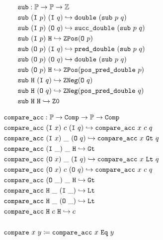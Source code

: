 \begin{align*}
&\texttt{sub} : \mathbb{P} \rightarrow \mathbb{P} \rightarrow \mathbb{Z} \\
& \texttt{sub}~(\texttt{I}~p)~(\texttt{I}~q) \hookrightarrow \texttt{double}~(\texttt{sub}~p~q) \\
& \texttt{sub}~(\texttt{I}~p)~(\texttt{O}~q) \hookrightarrow \texttt{succ\_double}~(\texttt{sub}~p~q) \\
& \texttt{sub}~(\texttt{I}~p)~\texttt{H} \hookrightarrow \mathop{\texttt{ZPos}} (\texttt{O}~p) \\
& \texttt{sub}~(\texttt{O}~p)~(\texttt{I}~q) \hookrightarrow \texttt{pred\_double}~(\texttt{sub}~p~q) \\
& \texttt{sub}~(\texttt{O}~p)~(\texttt{O}~q) \hookrightarrow \texttt{double}~(\texttt{sub}~p~q) \\
& \texttt{sub}~(\texttt{O}~p)~\texttt{H} \hookrightarrow \mathop{\texttt{ZPos}} (\texttt{pos\_pred\_double}~p) \\
& \texttt{sub}~\texttt{H}~(\texttt{I}~q) \hookrightarrow \mathop{\texttt{ZNeg}}    (\texttt{O}~q) \\
& \texttt{sub}~\texttt{H}~(\texttt{O}~q) \hookrightarrow \mathop{\texttt{ZNeg}}    (\texttt{pos\_pred\_double}~q) \\
& \texttt{sub}~\texttt{H}~\texttt{H} \hookrightarrow \texttt{Z0} \\
\end{align*}

\begin{align*}
&\texttt{compare\_acc} : \mathbb{P} \rightarrow \texttt{Comp} \rightarrow \mathbb{P} \rightarrow \texttt{Comp} \\
& \texttt{compare\_acc}~(\texttt{I}~x)~c~(\texttt{I}~q) \hookrightarrow \texttt{compare\_acc}~x~c~q \\
& \texttt{compare\_acc}~(\texttt{I}~x)~\_~(\texttt{O}~q) \hookrightarrow \texttt{compare\_acc}~x~\texttt{Gt}~q \\
& \texttt{compare\_acc}~(\texttt{I}~\_)~\_~\texttt{H} \hookrightarrow \texttt{Gt} \\
& \texttt{compare\_acc}~(\texttt{O}~x)~\_~(\texttt{I}~q) \hookrightarrow \texttt{compare\_acc}~x~\texttt{Lt}~q \\
& \texttt{compare\_acc}~(\texttt{O}~x)~c~(\texttt{O}~q) \hookrightarrow \texttt{compare\_acc}~x~c~q \\
& \texttt{compare\_acc}~(\texttt{O}~\_)~\_~\texttt{H} \hookrightarrow \texttt{Gt} \\
& \texttt{compare\_acc}~\texttt{H}~\_~(\texttt{I}~\_) \hookrightarrow \texttt{Lt} \\
& \texttt{compare\_acc}~\texttt{H}~\_~(\texttt{O}~\_) \hookrightarrow \texttt{Lt} \\
& \texttt{compare\_acc}~\texttt{H}~c~\texttt{H} \hookrightarrow c \\
\\
&\texttt{compare}~x~y \coloneq \texttt{compare\_acc}~x~\texttt{Eq}~y \\
\end{align*}
  
